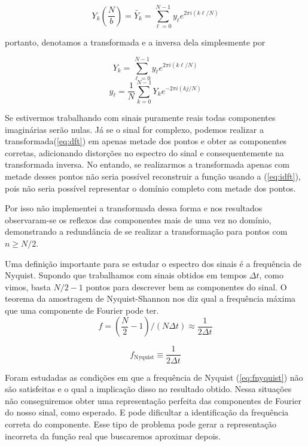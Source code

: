 \documentclass[a4paper, 11pt]{article}
\begin{document}
\[ Y_k \left( \frac{N}{b} \right) = \tilde{Y_k} = \sum_{\ell = 0}^{N-1} y_\ell e^{2\pi i \left( k\ell/N \right) } \]

portanto, denotamos a transformada e a inversa dela simplesmente por 

\begin{equation}
  Y_k = \sum_{\ell = 0}^{N-1} y_\ell e^{2\pi i \left( k\ell/N \right)}
  \label{eq:dft} 
\end{equation}
\begin{equation}
  y_\ell = \frac{1}{N} \sum_{k=0}^{N-1} Y_k e^{-2\pi i \left( kj/N \right)}
  \label{eq:idft} 
\end{equation}

Se estivermos trabalhando com sinais puramente reais todas componentes imaginárias serão
nulas. Já se o sinal for complexo, podemos realizar a transformada(\ref{eq:dft}) em apenas
metade dos pontos e obter as componentes corretas, adicionando distorções no espectro do sinal e
consequentemente na transformada inversa. No entando, se realizarmos a transformada apenas com metade
desses pontos não seria possível reconstruir a função usando a (\ref{eq:idft}), pois não seria
possível representar o domínio completo com metade dos pontos.


Por isso não implementei a transformada dessa forma e nos resultados observaram-se os reflexos das
componentes mais de uma vez no domínio, demonstrando a redundância de se realizar a transformação
para pontos com $n \geq N/2$.


Uma definição importante para se estudar o espectro dos sinais é a frequência de Nyquist. Supondo
que trabalhamos com sinais obtidos em tempos \( \Delta t \), como vimos, basta $N/2 - 1$ pontos para
descrever bem as componentes do sinal. O teorema da amostragem de Nyquist-Shannon nos diz qual a
frequência máxima que uma componente de Fourier pode ter.
\[ f =  \left( \frac{N}{2} - 1 \right)\bigg/ \left( N \Delta t\right) \approx \frac{1}{2\Delta t}\]

\begin{equation}
  f_{\text{Nyquist}} \equiv \frac{1}{2 \Delta t}
  \label{eq:fnyquist}
\end{equation}


Foram estudadas as condições em que a frequência de Nyquist (\ref{eq:fnyquist}) não são
satisfeitas e o qual a implicação disso no resultado obtido. Nessa situações não conseguiremos
obter uma representação perfeita das componentes de Fourier do nosso sinal, como esperado.
E pode dificultar a identificação da frequência correta do componente. Esse tipo de problema pode
gerar a representação incorreta da função real que buscaremos aproximar depois.
\end{document}
